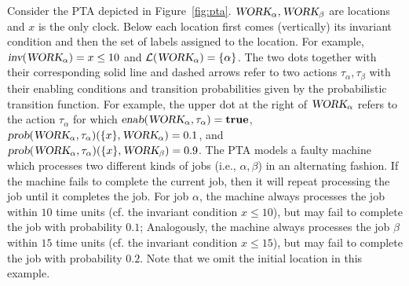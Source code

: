 \begin{example}\label{ex:pta}
Consider the PTA depicted in Figure~\ref{fig:pta}.
$\mbox{\sl WORK}_{\alpha},\mbox{\sl WORK}_{\beta}$ are locations
and $x$ is the only clock. Below each location first comes (vertically) its invariant condition and then the set of labels assigned to the location. For example, $\mbox{\sl inv}(\mbox{\sl WORK}_{\alpha})=x \le 10$
and $\mathcal{L}(\mbox{\sl WORK}_{\alpha})=\{ \alpha \}$.
The two dots together with their corresponding solid line and dashed arrows refer to two actions $\tau_\alpha,\tau_\beta$ with their enabling conditions and transition probabilities given by the probabilistic transition function.
For example, the upper dot at the right of $\mbox{\sl WORK}_{\alpha}$ refers to the action $\tau_\alpha$ for which $\mbox{\sl enab}(\mbox{\sl WORK}_{\alpha}, \tau_\alpha)=\mathbf{true}$, $\mbox{\sl prob}(\mbox{\sl WORK}_{\alpha}, \tau_\alpha)(\{x\},\mbox{\sl WORK}_{\alpha})=0.1$, and $\mbox{\sl prob}(\mbox{\sl WORK}_{\alpha}, \tau_\alpha)(\{x\},\mbox{\sl WORK}_{\beta})=0.9$.
The PTA models a faulty machine which processes two different kinds of jobs (i.e., $\alpha,\beta$) in an alternating fashion.
If the machine fails to complete the current job, then it will repeat processing the job until it completes the job.
For job $\alpha$, the machine always processes the job within $10$ time units (cf. the invariant condition $x\le 10$), but may fail to complete the job with probability $0.1$;
Analogously, the machine always processes the job $\beta$ within $15$ time units (cf. the invariant condition $x\le 15$), but may fail to complete the job with probability $0.2$.
Note that we omit the initial location in this example.
\end{example}
%
%

